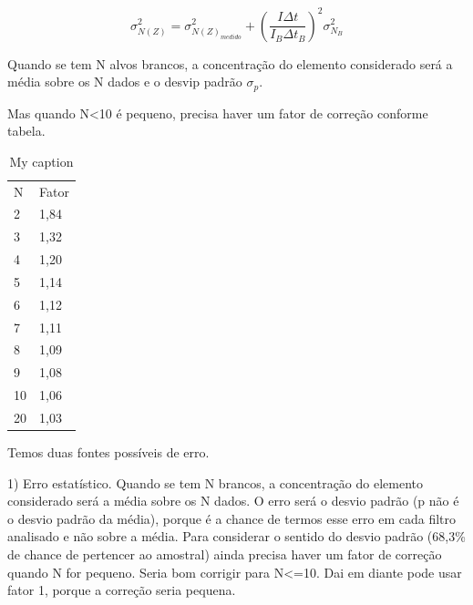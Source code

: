 \begin{equation}
  \label{eq:erro_contagemcorrigida}
  \sigma_{N(Z)}^2 = \sigma_{N(Z)_{medido}}^2 + \left( \frac{I \Delta t}{I_B \Delta t_B} \right)^2 \sigma_{N_B}^2
\end{equation}



Quando se tem N alvos brancos, a concentração do elemento 
considerado será a média sobre os N dados e o desvip padrão $\sigma_p$.

Mas quando N<10 é pequeno, precisa haver um fator de correção conforme tabela.

\begin{table}[H]
\centering
\caption{My caption}
\label{my-label}
\begin{tabular}{ll}
N  & Fator \\
2  & 1,84  \\
3  & 1,32  \\
4  & 1,20  \\
5  & 1,14  \\
6  & 1,12  \\
7  & 1,11  \\
8  & 1,09  \\
9  & 1,08  \\
10 & 1,06  \\
20 & 1,03 
\end{tabular}
\end{table}


Temos duas fontes possíveis de erro.

1) Erro estatístico. Quando se tem N brancos, a concentração do elemento considerado será a média sobre os N dados. O erro será o desvio padrão (p não é o desvio padrão da média), porque é a chance de termos esse erro em cada filtro analisado e não sobre a média. Para considerar o sentido do desvio padrão (68,3\% de chance de pertencer ao amostral) ainda precisa haver um fator de correção quando N for pequeno. Seria bom corrigir para N<=10. Dai em diante pode usar fator 1, porque a correção seria pequena.

